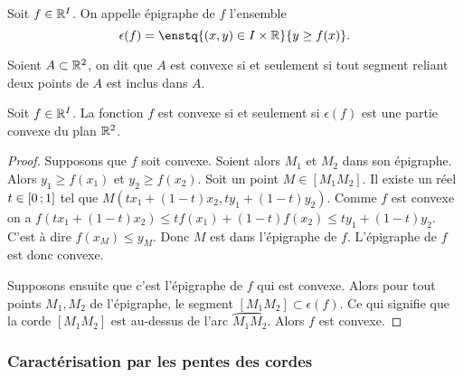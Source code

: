 \begin{defdef}
  Soit $f \in \mathbb{R}^I$. On appelle épigraphe de $f$ l'ensemble
  \begin{equation}
    \epsilon(f) = \enstq{(x,y) \in I\times\R}{y \geq f(x)}.
  \end{equation}
\end{defdef}
\begin{defdef}
  Soient $A \subset \mathbb{R}^2$, on dit que $A$ est convexe si et seulement si tout segment reliant deux points de $A$ est inclus dans $A$.
\end{defdef}
\begin{theo}
  Soit $f \in \mathbb{R}^I$. La fonction $f$ est convexe si et seulement si $\epsilon(f)$ est une partie convexe du plan $\mathbb{R}^2$.
\end{theo}
\begin{proof}
  Supposons que $f$ soit convexe. Soient alors $M_1$ et $M_2$ dans son épigraphe. Alors $y_1\geq f(x_1)$ et $y_2 \geq f(x_2)$. Soit un point $M \in [M_1M_2]$. Il existe un réel $t \in \left[ 0 \, ;  1 \right]$ tel que $M(tx_1+(1-t)x_2, ty_1+(1-t)y_2)$. Comme $f$ est convexe on a $f(tx_1+(1-t)x_2) \leq tf(x_1)+(1-t)f(x_2) \leq ty_1+(1-t)y_2$. C'est à dire $f(x_M) \leq y_M$. Donc $M$ est dans l'épigraphe de $f$. L'épigraphe de $f$ est donc convexe. 

  Supposons ensuite que c'est l'épigraphe de $f$ qui est convexe. Alors pour tout points $M_1,M_2$ de l'épigraphe, le segment $[M_1M_2] \subset \epsilon(f)$. Ce qui signifie que la corde $[M_1M_2]$ est au-dessus de l'arc $\wideparen{M_1M_2}$. Alors $f$ est convexe.
\end{proof}

\subsubsection{Caractérisation par les pentes des cordes}

